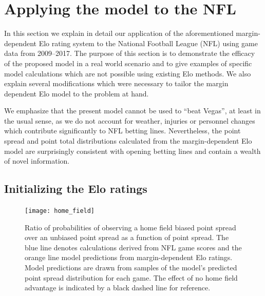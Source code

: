 \documentclass[aps,prc,reprint,amsmath,superscriptaddress,nofootinbib]{revtex4-1}
\begin{document}
\section{Applying the model to the NFL}

In this section we explain in detail our application of the aforementioned margin-dependent Elo rating system to the National Football League (NFL) using game data from 2009--2017.
The purpose of this section is to demonstrate the efficacy of the proposed model in a real world scenario and to give examples of specific model calculations which are not possible using existing Elo methods.
We also explain several modifications which were necessary to tailor the margin dependent Elo model to the problem at hand.

We emphasize that the present model cannot be used to ``beat Vegas'', at least in the usual sense, as we do not account for weather, injuries or personnel changes which contribute significantly to NFL betting lines.
Nevertheless, the point spread and point total distributions calculated from the margin-dependent Elo model are surprisingly consistent with opening betting lines and contain a wealth of novel information.

\subsection{Initializing the Elo ratings}

\begin{figure}
  \texttt{[image: home\_field]}
  \caption{\label{fig:home_field} Ratio of probabilities of observing a home field biased point spread over an unbiased point spread as a function of point spread. The blue line denotes calculations derived from NFL game scores and the orange line model predictions from margin-dependent Elo ratings. Model predictions are drawn from samples of the model's predicted point spread distribution for each game. The effect of no home field advantage is indicated by a black dashed line for reference.}
\end{figure}
\end{document}
